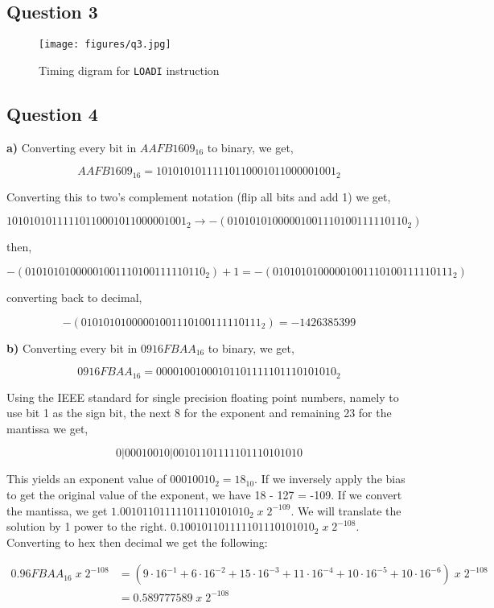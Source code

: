 \documentclass[a4paper,12pt]{article}
\def\code#1{\texttt{#1}}
\begin{document}
\subsection*{Question 3}

\begin{figure}[H]
    \centering
    \caption{Timing digram for \code{LOADI} instruction}
    \texttt{[image: figures/q3.jpg]}    
\end{figure}

\subsection*{Question 4}

\textbf{a)} Converting every bit in $AAFB1609_{16}$ to binary, we get,

$$AAFB1609_{16} = 10101010111110110001011000001001_{2}$$

Converting this to two's complement notation (flip all bits and add 1) we get,

$$10101010111110110001011000001001_{2} \rightarrow 
-(01010101000001001110100111110110_{2})$$

then,

$$-(01010101000001001110100111110110_{2}) + 1 =
-(01010101000001001110100111110111_{2})$$

converting back to decimal,

$$-(01010101000001001110100111110111_{2}) = -1426385399$$

\textbf{b)} Converting every bit in $0916FBAA_{16}$ to binary, we get,

$$0916FBAA_{16} = 00001001000101101111101110101010_{2}$$

Using the IEEE standard for single precision floating point numbers, namely to use bit 1 as the sign bit, the next 8 for the exponent and remaining 23 for the mantissa we get,

$$0|00010010|00101101111101110101010$$

This yields an exponent value of $00010010_2 = 18_{10}$. If we inversely apply the bias to get the original value of the exponent, we have 18 - 127 = -109. If we convert the mantissa, we get $1.00101101111101110101010_{2} \; x \; 2^{-109}$. We will translate the solution by 1 power to the right. $0.1001 0110 1111 1011 1010 1010_{2} \; x \; 2^{-108}$. Converting to hex then decimal we get the following:

\begin{align*}
    0.96FBAA_{16} \; x \; 2^{-108} &= (9\cdot16^{-1} + 6\cdot16^{-2} + 15\cdot16^{-3} + 11\cdot16^{-4} + 10\cdot16^{-5} + 10\cdot16^{-6}) \; x \; 2^{-108} \\
    &= 0.589777589 \; x \; 2^{-108}        
\end{align*}
\end{document}
